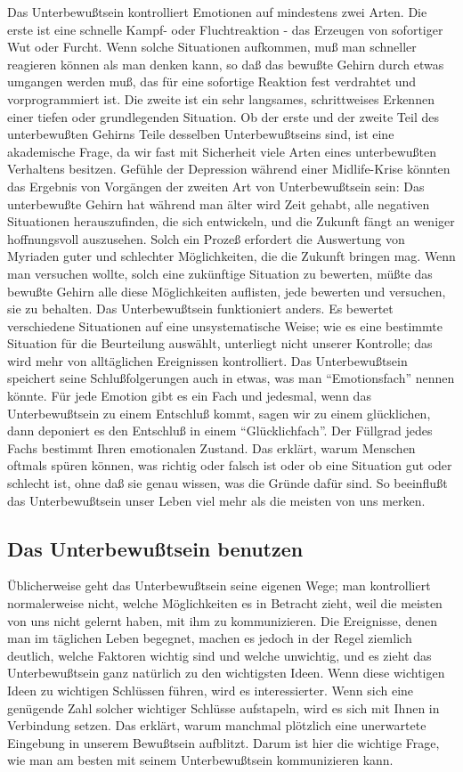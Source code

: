 Das Unterbewußtsein kontrolliert Emotionen auf mindestens zwei Arten.
Die erste ist eine schnelle Kampf- oder Fluchtreaktion - das Erzeugen von sofortiger Wut oder Furcht.
Wenn solche Situationen aufkommen, muß man schneller reagieren können als man denken kann, so daß das bewußte Gehirn durch etwas umgangen werden muß, das für eine sofortige Reaktion fest verdrahtet und vorprogrammiert ist.
Die zweite ist ein sehr langsames, schrittweises Erkennen einer tiefen oder grundlegenden Situation.
Ob der erste und der zweite Teil des unterbewußten Gehirns Teile desselben Unterbewußtseins sind, ist eine akademische Frage, da wir fast mit Sicherheit viele Arten eines unterbewußten Verhaltens besitzen.
Gefühle der Depression während einer Midlife-Krise könnten das Ergebnis von Vorgängen der zweiten Art von Unterbewußtsein sein: Das unterbewußte Gehirn hat während man älter wird Zeit gehabt, alle negativen Situationen herauszufinden, die sich entwickeln, und die Zukunft fängt an weniger hoffnungsvoll auszusehen.
Solch ein Prozeß erfordert die Auswertung von Myriaden guter und schlechter Möglichkeiten, die die Zukunft bringen mag.
Wenn man versuchen wollte, solch eine zukünftige Situation zu bewerten, müßte das bewußte Gehirn alle diese Möglichkeiten auflisten, jede bewerten und versuchen, sie zu behalten.
Das Unterbewußtsein funktioniert anders.
Es bewertet verschiedene Situationen auf eine unsystematische Weise; wie es eine bestimmte Situation für die Beurteilung auswählt, unterliegt nicht unserer Kontrolle; das wird mehr von alltäglichen Ereignissen kontrolliert.
Das Unterbewußtsein speichert seine Schlußfolgerungen auch in etwas, was man \enquote{Emotionsfach} nennen könnte.
Für jede Emotion gibt es ein Fach und jedesmal, wenn das Unterbewußtsein zu einem Entschluß kommt, sagen wir zu einem glücklichen, dann deponiert es den Entschluß in einem \enquote{Glücklichfach}.
Der Füllgrad jedes Fachs bestimmt Ihren emotionalen Zustand.
Das erklärt, warum Menschen oftmals spüren können, was richtig oder falsch ist oder ob eine Situation gut oder schlecht ist, ohne daß sie genau wissen, was die Gründe dafür sind.
So beeinflußt das Unterbewußtsein unser Leben viel mehr als die meisten von uns merken.


\subsection{Das Unterbewußtsein benutzen}
\label{c3_6c}

Üblicherweise geht das Unterbewußtsein seine eigenen Wege; man kontrolliert normalerweise nicht, welche Möglichkeiten es in Betracht zieht, weil die meisten von uns nicht gelernt haben, mit ihm zu kommunizieren.
Die Ereignisse, denen man im täglichen Leben begegnet, machen es jedoch in der Regel ziemlich deutlich, welche Faktoren wichtig sind und welche unwichtig, und es zieht das Unterbewußtsein ganz natürlich zu den wichtigsten Ideen.
Wenn diese wichtigen Ideen zu wichtigen Schlüssen führen, wird es interessierter.
Wenn sich eine genügende Zahl solcher wichtiger Schlüsse aufstapeln, wird es sich mit Ihnen in Verbindung setzen.
Das erklärt, warum manchmal plötzlich eine unerwartete Eingebung in unserem Bewußtsein aufblitzt.
Darum ist hier die wichtige Frage, wie man am besten mit seinem Unterbewußtsein kommunizieren kann.

